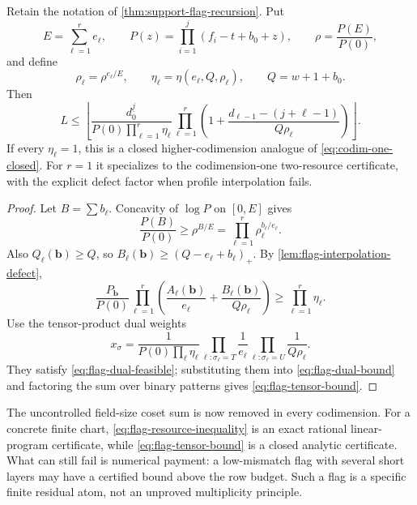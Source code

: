 \documentclass[11pt,a4paper]{amsart}
\numberwithin{equation}{section}
\theoremstyle{remark}
\begin{document}
\begin{corollary}
\label{cor:flag-tensor-certificate}
Retain the notation of \cref{thm:support-flag-recursion}.  Put
\[
 E=\sum_{\ell=1}^{r}e_\ell,
 \qquad
 P(z)=\prod_{i=1}^{j}(f_i-t+b_0+z),
 \qquad
 \rho=\frac{P(E)}{P(0)},
\]
and define
\[
 \rho_\ell=\rho^{e_\ell/E},
 \qquad
 \eta_\ell=\eta(e_\ell,Q,\rho_\ell),
 \qquad Q=w+1+b_0.
\]
Then
\begin{equation}
 \boxed{
 L\le
 \left\lfloor
 \frac{d_0^{\underline j}}
      {P(0)\prod_{\ell=1}^{r}\eta_\ell}
 \prod_{\ell=1}^{r}
 \left(
 1+\frac{d_{\ell-1}-(j+\ell-1)}{Q\rho_\ell}
 \right)
 \right\rfloor.}
 \label{eq:flag-tensor-bound}
\end{equation}
If every $\eta_\ell=1$, this is a closed higher-codimension analogue of
\eqref{eq:codim-one-closed}.  For $r=1$ it specializes to the
codimension-one two-resource certificate, with the explicit defect factor
when profile interpolation fails.
\end{corollary}

\begin{proof}
Let $B=\sum b_\ell$.  Concavity of $\log P$ on $[0,E]$ gives
\[
 \frac{P(B)}{P(0)}
 \ge\rho^{B/E}
 =\prod_{\ell=1}^{r}\rho_\ell^{b_\ell/e_\ell}.
\]
Also $Q_\ell(\mathbf b)\ge Q$, so
$B_\ell(\mathbf b)\ge(Q-e_\ell+b_\ell)_+$.  By
\cref{lem:flag-interpolation-defect},
\[
 \frac{P_{\mathbf b}}{P(0)}
 \prod_{\ell=1}^{r}
 \left(
  \frac{A_\ell(\mathbf b)}{e_\ell}
  +\frac{B_\ell(\mathbf b)}{Q\rho_\ell}
 \right)
 \ge\prod_{\ell=1}^{r}\eta_\ell.
\]
Use the tensor-product dual weights
\[
 x_\sigma=
 \frac1{P(0)\prod_\ell\eta_\ell}
 \prod_{\ell:\sigma_\ell=T}\frac1{e_\ell}
 \prod_{\ell:\sigma_\ell=U}\frac1{Q\rho_\ell}.
\]
They satisfy \eqref{eq:flag-dual-feasible}; substituting them into
\eqref{eq:flag-dual-bound} and factoring the sum over binary patterns
gives \eqref{eq:flag-tensor-bound}.
\end{proof}

\begin{remark}
\label{rem:flag-theorem-scope}
The uncontrolled field-size coset sum is now removed in every codimension.
For a concrete finite chart, \eqref{eq:flag-resource-inequality} is an
exact rational linear-program certificate, while
\eqref{eq:flag-tensor-bound} is a closed analytic certificate.  What can
still fail is numerical payment: a low-mismatch flag with several short
layers may have a certified bound above the row budget.  Such a flag is a
specific finite residual atom, not an unproved multiplicity principle.
\end{remark}
\end{document}
